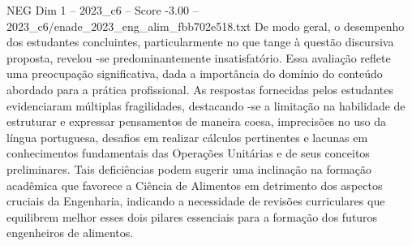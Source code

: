 \begin{textsample}{NEG Dim 1 – 2023\_c6 – Score -3.00 – 2023\_c6/enade\_2023\_eng\_alim\_fbb702e518.txt}
De modo geral, o desempenho dos estudantes concluintes, particularmente no que tange à questão discursiva proposta, revelou -se predominantemente insatisfatório.
Essa avaliação reflete uma preocupação significativa, dada a importância do domínio do conteúdo abordado para a prática profissional.
As respostas fornecidas pelos estudantes evidenciaram múltiplas fragilidades, destacando -se a limitação na habilidade de estruturar e expressar pensamentos de maneira coesa, imprecisões no uso da língua portuguesa, desafios em realizar cálculos pertinentes e lacunas em conhecimentos fundamentais das Operações Unitárias e de seus conceitos preliminares.
Tais deficiências podem sugerir uma inclinação na formação acadêmica que favorece a Ciência de Alimentos em detrimento dos aspectos cruciais da Engenharia, indicando a necessidade de revisões curriculares que equilibrem melhor esses dois pilares essenciais para a formação dos futuros engenheiros de alimentos.

\end{textsample}
